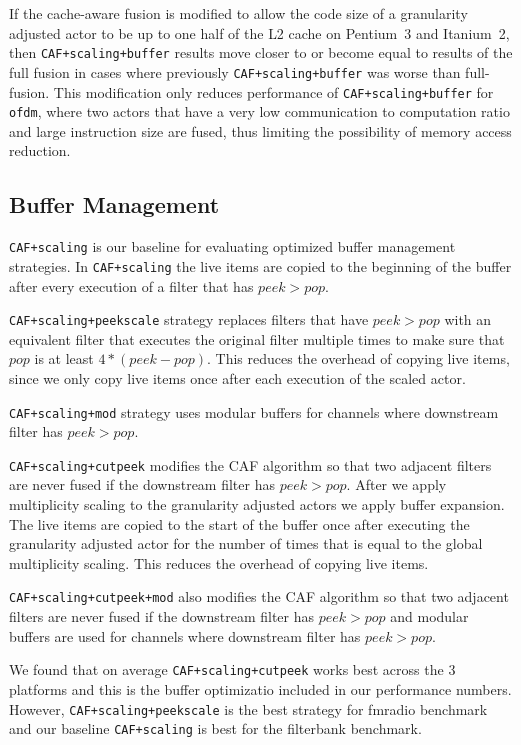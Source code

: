 If the cache-aware fusion is modified to allow the code size of a 
granularity adjusted actor to be up to one half of the L2 cache on 
Pentium~3 and Itanium~2, then \texttt{CAF+scaling+buffer} results
move closer to or become equal to results of the full fusion in cases where
previously \texttt{CAF+scaling+buffer} was worse than full-fusion.
This modification only reduces performance of \texttt{CAF+scaling+buffer}
for \texttt{ofdm}, where two actors that have a very low communication 
to computation ratio and large instruction size are fused, thus 
limiting the possibility of memory access reduction. 





\subsection{Buffer Management}

\texttt{CAF+scaling} is our baseline for evaluating optimized buffer 
management strategies. In \texttt{CAF+scaling} the live items are 
copied to the beginning of the buffer after every execution of a filter 
that has $peek>pop$.

\texttt{CAF+scaling+peekscale} strategy replaces filters that have
$peek>pop$ with an equivalent filter that executes the original filter 
multiple times to make sure that $pop$ is at least $4*(peek-pop)$.
This reduces the overhead of copying live items, since we only copy live 
items once after each execution of the scaled actor.

\texttt{CAF+scaling+mod} strategy uses modular buffers for channels where 
downstream filter has $peek>pop$.

\texttt{CAF+scaling+cutpeek} modifies the CAF algorithm so that two 
adjacent filters are never fused if the downstream filter has 
$peek>pop$. After we apply multiplicity scaling to the 
granularity adjusted actors we apply buffer expansion. The 
live items are copied to the start of the buffer once after executing 
the granularity adjusted actor for the number of times that is equal 
to the global multiplicity scaling. This reduces the overhead of 
copying live items.

\texttt{CAF+scaling+cutpeek+mod} also modifies the CAF algorithm so 
that two adjacent filters are never fused if the downstream filter has 
$peek>pop$ and modular buffers are used for channels 
where downstream filter has $peek>pop$.

We found that on average \texttt{CAF+scaling+cutpeek} works best across 
the 3 platforms and this is the buffer optimizatio included in our 
performance numbers. However, \texttt{CAF+scaling+peekscale} is the 
best strategy for fmradio benchmark and our baseline \texttt{CAF+scaling} 
is best for the filterbank benchmark.




